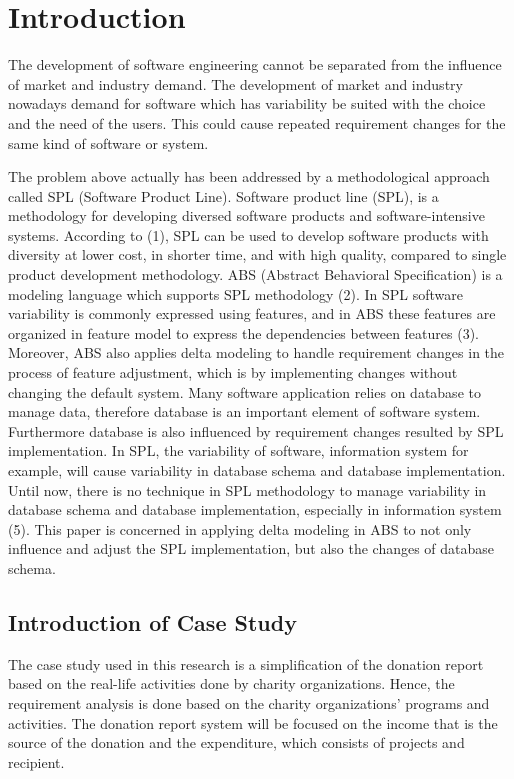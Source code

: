 \documentclass[runningheads,a4paper]{llncs}
\begin{document}
\section{Introduction}

The development of software engineering cannot be separated from the influence of market and industry demand. The development of market and industry nowadays demand for software which has variability be suited with the choice and the need of the users. This could cause repeated requirement changes for the same kind of software or system.

The problem above actually has been addressed by a methodological approach called SPL (Software Product Line). Software product line (SPL), is a methodology for developing diversed software products and software-intensive systems. According to (1), SPL can be used to develop software products with diversity at lower cost, in shorter time, and with high quality, compared to single product development methodology.
ABS (Abstract Behavioral Specification) is a modeling language which supports SPL methodology (2). In SPL software variability is commonly expressed using features, and in ABS these features are organized in feature model to express the dependencies between features (3). Moreover, ABS also applies delta modeling to handle requirement changes in the process of feature adjustment, which is by implementing changes without changing the default system.
Many software application relies on database to manage data, therefore database is an important element of software system. Furthermore database is also influenced by requirement changes resulted by SPL implementation. In SPL, the variability of software, information system for example, will cause variability in database schema and database implementation. Until now, there is no technique in SPL methodology to manage variability in database schema and database implementation, especially in information system (5). This paper is concerned in applying delta modeling in ABS to not only influence and adjust the  SPL implementation, but also the changes of database schema.
\subsection{Introduction of Case Study}

The case study used in this research is a simplification of the donation report based on the real-life activities done by charity organizations. Hence, the requirement analysis is done based on the charity organizations’ programs and activities. The donation report system will be focused on the income that is the source of the donation and the expenditure, which consists of projects and recipient.
\end{document}
